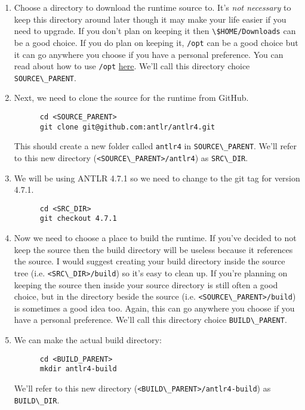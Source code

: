 \documentclass{article}
\begin{document}
\begin{enumerate}
  \item
    Choose a directory to download the runtime source to. It's \emph{not necessary} to keep this
    directory around later though it may make your life easier if you need to upgrade. If you don't
    plan on keeping it then \lstinline{\$HOME/Downloads} can be a good choice. If you do plan on
    keeping it, \lstinline{/opt} can be a good choice but it can go anywhere you choose if you have
    a personal preference. You can read about how to use \lstinline{/opt}
    \href{https://askubuntu.com/a/34922/550300} {here}. We'll call this directory choice
    \lstinline{SOURCE\_PARENT}.
  \item
    Next, we need to clone the source for the runtime from GitHub.
    \begin{lstlisting}
      cd <SOURCE_PARENT>
      git clone git@github.com:antlr/antlr4.git
    \end{lstlisting}
    This should create a new folder called \lstinline{antlr4} in \lstinline{SOURCE\_PARENT}. We'll
    refer to this new directory (\lstinline{<SOURCE\_PARENT>/antlr4}) as \lstinline{SRC\_DIR}.
  \item
    We will be using ANTLR 4.7.1 so we need to change to the git tag for version 4.7.1.
    \begin{lstlisting}
      cd <SRC_DIR>
      git checkout 4.7.1
    \end{lstlisting}
  \item
    Now we need to choose a place to build the runtime. If you've decided to not keep the source
    then the build directory will be useless because it references the source. I would suggest
    creating your build directory inside the source tree (i.e. \lstinline{<SRC\_DIR>/build}) so
    it's easy to clean up. If you're planning on keeping the source then inside your source
    directory is still often a good choice, but in the directory beside the source (i.e.
    \lstinline{<SOURCE\_PARENT>/build}) is sometimes a good idea too. Again, this can go anywhere
    you choose if you have a personal preference. We'll call this directory choice
    \lstinline{BUILD\_PARENT}.
  \item
    We can make the actual build directory:
    \begin{lstlisting}
      cd <BUILD_PARENT>
      mkdir antlr4-build
    \end{lstlisting}
    We'll refer to this new directory (\lstinline{<BUILD\_PARENT>/antlr4-build}) as
    \lstinline{BUILD\_DIR}.

\end{enumerate}
\end{document}
